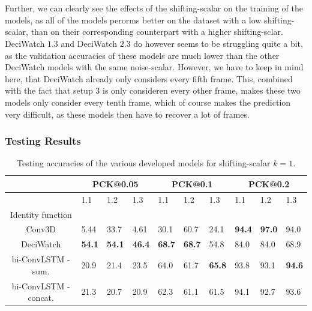 \documentclass[./main.tex]{subfiles}
\begin{document}
\\
\\
Further, we can clearly see the effects of the shifting-scalar on the training of the models, as all of the models perorms better on the dataset with a low shifting-scalar, than on their corresponding counterpart with a higher shifting-sclar. DeciWatch $1.3$ and DeciWatch $2.3$ do however seems to be struggling quite a bit, as the validation accuracies of these models are much lower than the other DeciWatch models with the same noise-scalar. However, we have to keep in mind here, that DeciWatch already only considers every fifth frame. This, combined with the fact that setup $3$ is only consideren every other frame, makes these two models only consider every tenth frame, which of course makes the prediction very difficult, as these models then have to recover a lot of frames.

\subsubsection{Testing Results}
\begin{table}[htbp]
    \begin{tabular}{c||lll|lll|lll}
        \hline
        & \multicolumn{3}{c}{PCK@0.05} & \multicolumn{3}{c}{PCK@0.1} & \multicolumn{3}{c}{PCK@0.2} \\
        \hline
        & 1.1 & 1.2 & 1.3 & 1.1 & 1.2 & 1.3 & 1.1 & 1.2 & 1.3 \\
        \hline
        Identity function & & & & & & & & & \\
        Conv3D & 5.44 & 33.7 & 4.61 & 30.1 & 60.7 & 24.1 & \textbf{94.4} & \textbf{97.0} & 94.0 \\
        DeciWatch & \textbf{54.1} & \textbf{54.1} & \textbf{46.4} & \textbf{68.7} & \textbf{68.7} & 54.8 & 84.0 & 84.0 & 68.9 \\
        bi-ConvLSTM - sum. & 20.9 & 21.4 & 23.5 & 64.0 & 61.7 & \textbf{65.8} & 93.8 & 93.1 & \textbf{94.6} \\
        bi-ConvLSTM - concat. & 21.3 & 20.7 & 20.9 & 62.3 & 61.1 & 61.5 & 94.1 & 92.7 & 93.6 \\
        \hline
    \end{tabular}
    \label{tab:pretrain_test_accs_1}
    \caption{Testing accuracies of the various developed models for shifting-scalar $k = 1$.}
\end{table}
\end{document}
